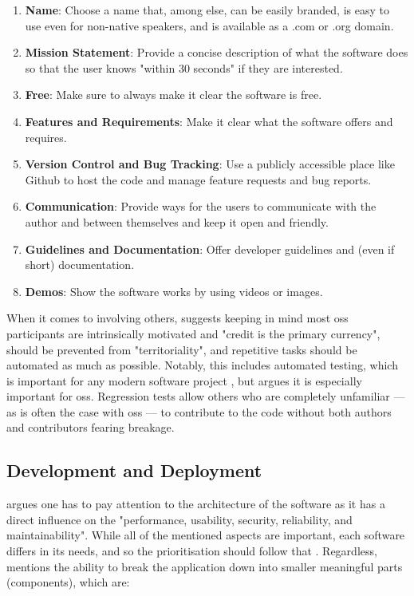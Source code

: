 \begin{enumerate}
    \item \textbf{Name}: Choose a name that, among else, can be easily branded, is easy to use even for non-native speakers, and is available as a .com or .org domain.
    \item \textbf{Mission Statement}: Provide a concise description of what the software does so that the user knows "within 30 seconds" \parencite{Fogel_2022} if they are interested.
    \item \textbf{Free}: Make sure to always make it clear the software is free.
    \item \textbf{Features and Requirements}: Make it clear what the software offers and requires.
    \item \textbf{Version Control and Bug Tracking}: Use a publicly accessible place like Github to host the code and manage feature requests and bug reports.
    \item \textbf{Communication}: Provide ways for the users to communicate with the author and between themselves and keep it open and friendly.
    \item \textbf{Guidelines and Documentation}: Offer developer guidelines and (even if short) documentation.
    \item \textbf{Demos}: Show the software works by using videos or images.
\end{enumerate}

When it comes to involving others, \textcite[Chapter~8]{Fogel_2022} suggests keeping in mind most \gls{oss} participants are intrinsically motivated and "credit is the primary currency", should be prevented from "territoriality", and repetitive tasks should be automated as much as possible.
Notably, this includes automated testing, which is important for any modern software project \parencite[Chapter~9]{Sommerville_2019}, but \textcite[Chapter~8]{Fogel_2022} argues it is especially important for \gls{oss}.
Regression tests allow others who are completely unfamiliar --- as is often the case with \gls{oss} --- to contribute to the code without both authors and contributors fearing breakage.

\subsection{Development and Deployment}

\textcite[Chapter~4]{Sommerville_2019} argues one has to pay attention to the architecture of the software as it has a direct influence on the "performance, usability, security, reliability, and maintainability".
While all of the mentioned aspects are important, each software differs in its needs, and so the prioritisation should follow that \parencite[Chapter~4]{Sommerville_2019}.
Regardless, \textcite[Chapter~4]{Sommerville_2019} mentions the ability to break the application down into smaller meaningful parts (components), which are:

